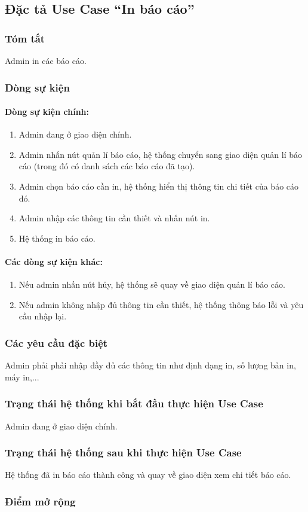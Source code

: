 \subsection{Đặc tả Use Case ``In báo cáo''}

\subsubsection{Tóm tắt}
Admin in các báo cáo.

\subsubsection{Dòng sự kiện}
\paragraph{\textbf{Dòng sự kiện chính:}}
\begin{enumerate}
  \item Admin đang ở giao diện chính.
  \item Admin nhấn nút quản lí báo cáo, hệ thống chuyển sang giao diện quản lí báo cáo (trong đó có danh sách các báo cáo đã tạo).
  \item Admin chọn báo cáo cần in, hệ thống hiển thị thông tin chi tiết của báo cáo đó.
  \item Admin nhập các thông tin cần thiết và nhấn nút in.
  \item Hệ thống in báo cáo.
\end{enumerate}

\paragraph{\textbf{Các dòng sự kiện khác:}}
\begin{enumerate}
  \item Nếu admin nhấn nút hủy, hệ thống sẽ quay về giao diện quản lí báo cáo.
  \item Nếu admin không nhập đủ thông tin cần thiết, hệ thống thông báo lỗi và yêu cầu nhập lại.
\end{enumerate}

\subsubsection{Các yêu cầu đặc biệt}
Admin phải phải nhập đầy đủ các thông tin như định dạng in, số lượng bản in, máy in,...

\subsubsection{Trạng thái hệ thống khi bắt đầu thực hiện Use Case}
Admin đang ở giao diện chính.

\subsubsection{Trạng thái hệ thống sau khi thực hiện Use Case}
Hệ thống đã in báo cáo thành công và quay về giao diện xem chi tiết báo cáo.

\subsubsection{Điểm mở rộng}